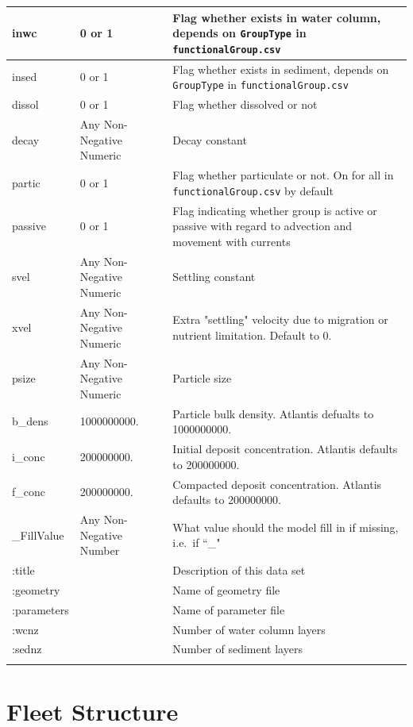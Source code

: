 \documentclass{report}
\begin{document}
\begin{center}
\begin{longtable}{llp{8cm}}
\hline
inwc & 0 or 1 & Flag whether exists in water column, depends on \texttt{GroupType} in \texttt{functionalGroup.csv} \\
\hline
insed & 0 or 1 & Flag whether exists in sediment, depends on \texttt{GroupType} in \texttt{functionalGroup.csv} \\
\hline
dissol & 0 or 1 & Flag whether dissolved or not \\
\hline
decay & Any Non-Negative Numeric & Decay constant \\
\hline 
partic & 0 or 1 & Flag whether particulate or not. On for all in \texttt{functionalGroup.csv} by default \\
\hline 
passive & 0 or 1 & Flag indicating whether group is active or passive with regard to advection and movement with currents \\
\hline
svel & Any Non-Negative Numeric & Settling constant \\ 
\hline
xvel & Any Non-Negative Numeric & Extra "settling" velocity due to migration or nutrient limitation. Default to 0. \\
\hline
psize & Any Non-Negative Numeric & Particle size \\
\hline
b\_dens & 1000000000. & Particle bulk density. Atlantis defualts to 1000000000. \\
\hline
i\_conc & 200000000. & Initial deposit concentration. Atlantis defaults to 200000000. \\
\hline
f\_conc & 200000000. & Compacted deposit concentration. Atlantis defaults to 200000000. \\
\hline
\_FillValue & Any Non-Negative Number & What value should the model fill in if missing, i.e.\ if  ``\_" \\
\hline
:title & &  Description of this data set \\
\hline
:geometry  & & Name of geometry file \\
\hline
:parameters  & & Name of parameter file \\
\hline
:wcnz & & Number of water column layers \\
\hline
:sednz & & Number of sediment layers \\
\hline
\label{tab:init}
\end{longtable}
\end{center}





\section{Fleet Structure}
\end{document}
